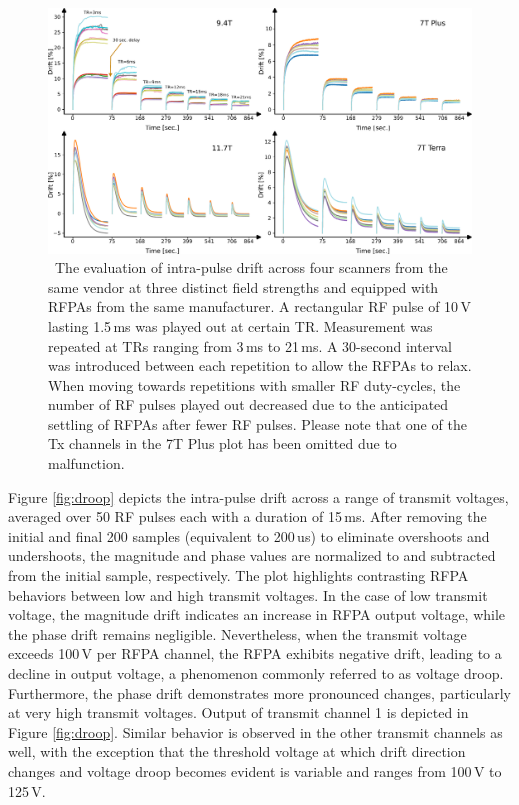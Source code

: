\begin{figure}[t]
    \centering
    \includegraphics[width=\textwidth]{figures/inter-scanner.pdf}
    \caption{\ The evaluation of intra-pulse drift across four scanners from the same vendor at three distinct field strengths and equipped with RFPAs from the same manufacturer. A rectangular RF pulse of 10\,V lasting 1.5\,ms was played out at certain TR. Measurement was repeated at TRs ranging from 3\,ms to 21\,ms. A 30-second interval was introduced between each repetition to allow the RFPAs to relax. When moving towards repetitions with smaller RF duty-cycles, the number of RF pulses played out decreased due to the anticipated settling of RFPAs after fewer RF pulses. Please note that one of the Tx channels in the 7T Plus plot has been omitted due to malfunction.}
    \label{fig:inter-scanner}
\end{figure}

Figure \ref{fig:droop} depicts the intra-pulse drift across a range of transmit voltages, averaged over 50 RF pulses each with a duration of 15\,ms. After removing the initial and final 200 samples (equivalent to 200\,us) to eliminate overshoots and undershoots, the magnitude and phase values are normalized to and subtracted from the initial sample, respectively. The plot highlights contrasting RFPA behaviors between low and high transmit voltages. In the case of low transmit voltage, the magnitude drift indicates an increase in RFPA output voltage, while the phase drift remains negligible. Nevertheless, when the transmit voltage exceeds 100\,V per RFPA channel, the RFPA exhibits negative drift, leading to a decline in output voltage, a phenomenon commonly referred to as voltage droop. Furthermore, the phase drift demonstrates more pronounced changes, particularly at very high transmit voltages. Output of transmit channel 1 is depicted in Figure \ref{fig:droop}. Similar behavior is observed in the other transmit channels as well, with the exception that the threshold voltage at which drift direction changes and voltage droop becomes evident is variable and ranges from 100\,V to 125\,V.

